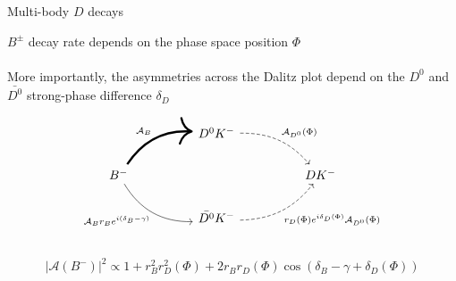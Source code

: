 \documentclass[dvipsnames]{beamer}
\begin{document}
\begin{frame}[fragile]{Multi-body $D$ decays}
  \begin{center}
    $B^\pm$ decay rate depends on the phase space position $\Phi$\\~\\
    More importantly, the asymmetries across the Dalitz plot depend on the $D^0$ and $\bar{D^0}$ strong-phase difference $\delta_D$
  \end{center}
  \begin{equation*}
    \begin{tikzcd}[column sep=huge]
      & D^0K^- \arrow[dr, bend left = 25, dashed, "\mathcal{A}_{D^0}(\Phi)"] & \\
      B^- \arrow[ur, bend left, line width = 1.7, "\mathcal{A}_B"] \arrow[dr, bend right, "\mathcal{A}_B r_B e^{i(\delta_B - \gamma)}"'] & [5cm] & DK^- \\
      & \bar{D^0}K^- \arrow[ur, bend right = 25, dashed, "r_D(\Phi)e^{i\delta_D(\Phi)}\mathcal{A}_{D^0}(\Phi)"'] & \\
    \end{tikzcd}
  \end{equation*}
  \vspace{-0.5cm}
  \begin{equation*}
    \lvert\mathcal{A}(B^-)\lvert^2\propto1 + r_B^2r_D^2(\Phi) + 2r_Br_D(\Phi)\cos(\delta_B - \gamma + \delta_D(\Phi))
  \end{equation*}
\end{frame}
\end{document}
